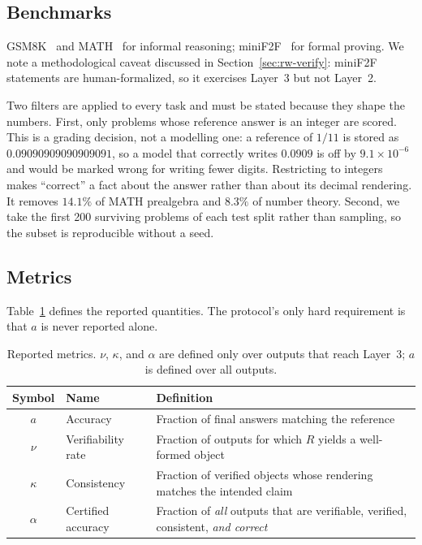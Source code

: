 \documentclass[11pt,a4paper]{article}
\begin{document}
\subsection{Benchmarks}
\label{sec:protocol-benchmarks}
GSM8K~\cite{cobbe2021gsm8k} and MATH~\cite{hendrycks2021math} for informal
reasoning; miniF2F~\cite{zheng2022minif2f} for formal proving.  We note a
methodological caveat discussed in Section~\ref{sec:rw-verify}: miniF2F
statements are human-formalized, so it exercises Layer~3 but not Layer~2.

Two filters are applied to every task and must be stated because they shape the
numbers.  First, only problems whose reference answer is an integer are scored.
This is a grading decision, not a modelling one: a reference of $1/11$ is stored
as $0.09090909090909091$, so a model that correctly writes $0.0909$ is off by
$9.1\times10^{-6}$ and would be marked wrong for writing fewer digits.
Restricting to integers makes ``correct'' a fact about the answer rather than
about its decimal rendering.  It removes $14.1\%$ of MATH prealgebra and $8.3\%$
of number theory.  Second, we take the first 200 surviving problems of each test
split rather than sampling, so the subset is reproducible without a seed.

\subsection{Metrics}
Table~\ref{tab:metrics} defines the reported quantities.  The protocol's only
hard requirement is that $a$ is never reported alone.

\begin{table}[t]
\centering
\caption{Reported metrics.  $\nu$, $\kappa$, and $\alpha$ are defined only over
outputs that reach Layer~3; $a$ is defined over all outputs.}
\label{tab:metrics}
\begin{tabular}{@{}clp{5.4cm}@{}}
\toprule
Symbol & Name & Definition \\
\midrule
$a$ & Accuracy & Fraction of final answers matching the reference \\
$\nu$ & Verifiability rate & Fraction of outputs for which $R$ yields a well-formed object \\
$\kappa$ & Consistency & Fraction of verified objects whose rendering matches the intended claim \\
$\alpha$ & Certified accuracy & Fraction of \emph{all} outputs that are verifiable, verified, consistent, \emph{and correct} \\
\bottomrule
\end{tabular}
\end{table}
\end{document}
